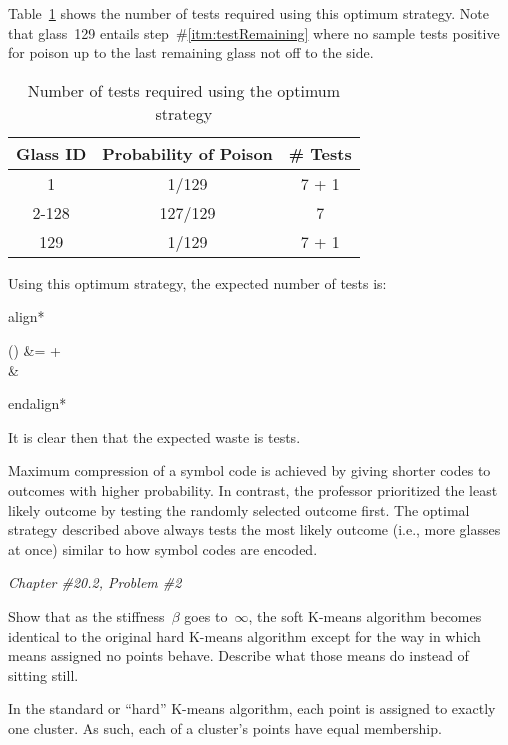 \documentclass{report}
\newenvironment{aligncustom}
{ \csname align*\endcsname %
    \centering
}
{
  \csname endalign*\endcsname
}
\newcounter{subProbCount}       %
\newenvironment{problemshell}{
  \par%
  \medskip
  \leftskip=0pt\rightskip=0pt%
}
{
  \par\medskip
  \setcounter{subProbCount}{1} %
}
\newenvironment{problem}[3]
{%
  \begin{problemshell}
    \noindent \textit{Chapter \##1.#2, Problem \##3} \\
    \bfseries
}
{
  \end{problemshell}
}
\begin{document}
  Table~\ref{tab:problem5.9.20-Opt} shows the number of tests required using this optimum strategy.    Note that glass~129 entails step~\#\ref{itm:testRemaining} where no sample tests positive for poison up to the last remaining glass not off to the side.

  \begin{table}[h]
    \centering
    \begin{tabular}{c|c|c}
      \hline
      Glass ID & Probability of Poison & \# Tests  \\\hline
      1        & 1/129                 & 7 + 1     \\\hline
      2-128    & 127/129               & 7         \\\hline
      129      & 1/129                 & 7 + 1     \\\hline
    \end{tabular}
    \caption{Number of tests required using the optimum strategy}\label{tab:problem5.9.20-Opt}
  \end{table}

  \noindent
  Using this optimum strategy, the expected number of tests is:


  \begin{aligncustom}
    () &=   +   \\
    &\approx {}
  \end{aligncustom}

  It is clear then that the expected waste is  tests.

  Maximum compression of a symbol code is achieved by giving shorter codes to outcomes with higher probability.  In contrast, the professor prioritized the least likely outcome by testing the randomly selected outcome first.  The optimal strategy described above always tests the most likely outcome (i.e., more glasses at once) similar to how symbol codes are encoded.


  \newpage
  \begin{problem}{20}{2}{2}
    Show that as the stiffness~$\beta$ goes to~$\infty$, the soft K-means algorithm becomes identical to the original hard K-means algorithm except for the way in which means assigned no points behave.  Describe what those means do instead of sitting still.
  \end{problem}

  In the standard or ``hard'' K-means algorithm, each point is assigned to exactly one cluster.  As such, each of a cluster's points have equal membership.
\end{document}
